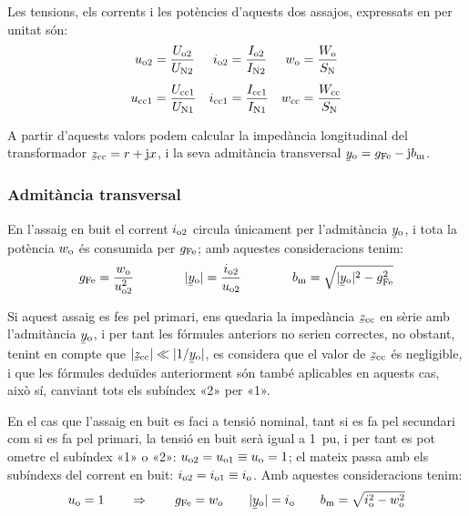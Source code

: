 Les tensions, els corrents i les potències d'aquests dos  assajos,
expressats en per unitat són:
\begin{align}
    u_\mathrm{o2} &=\frac{U_\mathrm{o2}}{U_\mathrm{N2}} &
    i_\mathrm{o2} &=\frac{I_\mathrm{o2}}{I_\mathrm{N2}} &
    w_\mathrm{o}  &=\frac{W_\mathrm{o}}{S_\mathrm{N}} \\[1ex]
    u_\mathrm{cc1} &=\frac{U_\mathrm{cc1}}{U_\mathrm{N1}} &
    i_\mathrm{cc1} &=\frac{I_\mathrm{cc1}}{I_\mathrm{N1}} &
    w_\mathrm{cc} &=\frac{W_\mathrm{cc}}{S_\mathrm{N}}
\end{align}

A partir d'aquests valors podem calcular la impedància longitudinal
del transformador $\cmplx{z}\ped{cc}=r+\ju x$, i la seva admitància
transversal $\cmplx{y}\ped{o}=g\ped{Fe}-\ju b\ped{m}$.

\subsubsection{Admitància transversal}

En l'assaig en buit el corrent $i_\mathrm{o2}$ circula
únicament per l'admitància $\cmplx{y}\ped{o}$, i tota la potència
$w_\mathrm{o}$ és consumida per $g_\mathrm{Fe}$; amb aquestes consideracions
tenim:
\begin{equation}
    g\ped{Fe} = \frac{w\ped{o}}{u\ped{o2}^2} \qquad\qquad
    |\cmplx{y}\ped{o}| = \frac{i\ped{o2}}{u\ped{o2}}
    \qquad\qquad
    b\ped{m} = \sqrt{|\cmplx{y}\ped{o}|^2 - g\ped{Fe}^2}
\end{equation}

Si aquest assaig es fes pel primari, ens quedaria la impedància
$\cmplx{z}\ped{cc}$ en sèrie amb l'admitància $\cmplx{y}\ped{o}$, i
per tant les fórmules anteriors no serien correctes, no obstant,
tenint en compte que $|\cmplx{z}\ped{cc}| \ll |1/\cmplx{y}\ped{o}|$,
es  considera que el valor de $\cmplx{z}\ped{cc}$ és negligible, i
que les fórmules deduïdes anteriorment són també aplicables en
aquests cas, això sí, canviant tots els subíndex «2» per «1».

En el cas que l'assaig en buit es faci a tensió nominal, tant  si es
fa pel secundari com si es fa pel primari, la tensió en buit serà
igual a \SI{1}{pu}, i per tant es pot ometre el subíndex «1» o «2»:
$u_\mathrm{o2} = u_\mathrm{o1} \equiv u_\mathrm{o} = 1$; el mateix passa amb els
subíndexs del corrent en buit: $i_\mathrm{o2} = i_\mathrm{o1} \equiv
i_\mathrm{o}$. Amb aquestes consideracions tenim:
\begin{equation}
    u\ped{o} = 1 \qquad \Rightarrow \qquad g\ped{Fe} = w\ped{o} \qquad
    |\cmplx{y}\ped{o}| = i\ped{o} \qquad
    b\ped{m} = \sqrt{i\ped{o}^2 - w\ped{o}^2}
    \label{eq:assaig-buit-nomianl}
\end{equation}

